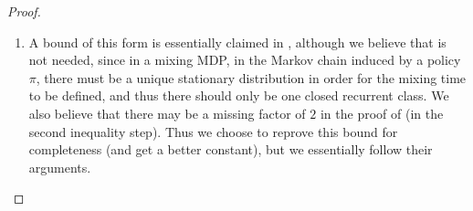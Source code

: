 \documentclass{article}
\theoremstyle{plain}
\theoremstyle{plain}
\theoremstyle{remark}
\theoremstyle{plain}
\theoremstyle{plain}
\begin{document}
\begin{proof}
    \begin{enumerate}
        \item A bound of this form is essentially claimed in \cite[Lemma 9, Proposition 10]{wang_near_2022}, although we believe that \cite[Proposition 10]{wang_near_2022} is not needed, since in a mixing MDP, in the Markov chain induced by a policy $\pi$, there must be a unique stationary distribution in order for the mixing time to be defined, and thus there should only be one closed recurrent class. We also believe that there may be a missing factor of $2$ in the proof of \cite[Lemma 9]{wang_near_2022} (in the second inequality step). Thus we choose to reprove this bound for completeness (and get a better constant), but we essentially follow their arguments.


\end{enumerate}
\end{proof}
\end{document}
